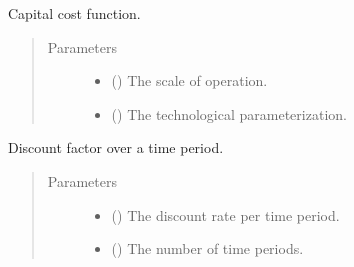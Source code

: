 \documentclass[letterpaper,10pt,english]{sphinxmanual}
\begin{document}
\begin{fulllineitems}
\label{\detokenize{doc-src/technology:technology.pv_residential_generic.capital_cost}}
Capital cost function.
\begin{quote}\begin{description}
\item[{Parameters}] \leavevmode\begin{itemize}
\item {} 
 () \textendash{} The scale of operation.

\item {} 
 () \textendash{} The technological parameterization.

\end{itemize}

\end{description}\end{quote}

\end{fulllineitems}


\begin{fulllineitems}
\label{\detokenize{doc-src/technology:technology.pv_residential_generic.discount}}
Discount factor over a time period.
\begin{quote}\begin{description}
\item[{Parameters}] \leavevmode\begin{itemize}
\item {} 
 () \textendash{} The discount rate per time period.

\item {} 
 () \textendash{} The number of time periods.

\end{itemize}

\end{description}\end{quote}

\end{fulllineitems}
\end{document}
